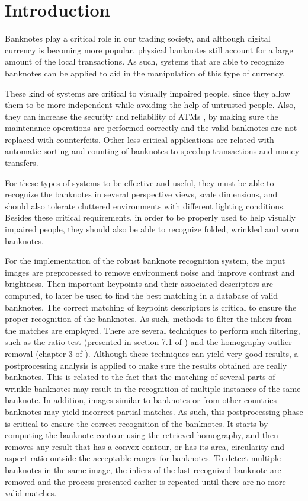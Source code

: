 \section{Introduction}\label{sec:introduction}

Banknotes play a critical role in our trading society, and although digital currency is becoming more popular, physical banknotes still account for a large amount of the local transactions. As such, systems that are able to recognize banknotes can be applied to aid in the manipulation of this type of currency.

These kind of systems are critical to visually impaired people, since they allow them to be more independent while avoiding the help of untrusted people. Also, they can increase the security and reliability of ATMs \cite{Sako2007}, by making sure the maintenance operations are performed correctly and the valid banknotes are not replaced with counterfeits. Other less critical applications are related with automatic sorting and counting of banknotes to speedup transactions and money transfers.

For these types of systems to be effective and useful, they must be able to recognize the banknotes in several perspective views, scale dimensions, and should also tolerate cluttered environments with different lighting conditions. Besides these critical requirements, in order to be properly used to help visually impaired people, they should also be able to recognize folded, wrinkled and worn banknotes.

For the implementation of the robust banknote recognition system, the input images are preprocessed to remove environment noise and improve contrast and brightness. Then important keypoints and their associated descriptors are computed, to later be used to find the best matching in a database of valid banknotes. The correct matching of keypoint descriptors is critical to ensure the proper recognition of the banknotes. As such, methods to filter the inliers from the matches are employed. There are several techniques to perform such filtering, such as the ratio test (presented in section 7.1 of \cite{Lowe2004}) and the homography outlier removal (chapter 3 of \cite{Baggio2012}). Although these techniques can yield very good results, a postprocessing analysis is applied to make sure the results obtained are really banknotes. This is related to the fact that the matching of several parts of wrinkle banknotes may result in the recognition of multiple instances of the same banknote. In addition, images similar to banknotes or from other countries banknotes may yield incorrect partial matches. As such, this postprocessing phase is critical to ensure the correct recognition of the banknotes. It starts by computing the banknote contour using the retrieved homography, and then removes any result that has a convex contour, or has its area, circularity and aspect ratio outside the acceptable ranges for banknotes. To detect multiple banknotes in the same image, the inliers of the last recognized banknote are removed and the process presented earlier is repeated until there are no more valid matches.

